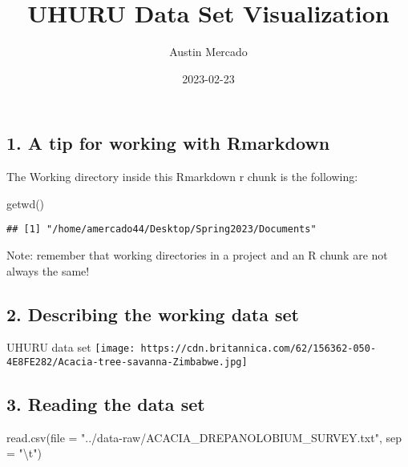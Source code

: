 \documentclass[
]{article}
\title{UHURU Data Set Visualization}
\author{Austin Mercado}
\date{2023-02-23}
\newenvironment{Shaded}{\begin{snugshade}}{\end{snugshade}}
\newcommand{\AttributeTok}[1]{\textcolor[rgb]{0.77,0.63,0.00}{#1}}
\newcommand{\FunctionTok}[1]{\textcolor[rgb]{0.00,0.00,0.00}{#1}}
\newcommand{\NormalTok}[1]{#1}
\newcommand{\SpecialCharTok}[1]{\textcolor[rgb]{0.00,0.00,0.00}{#1}}
\newcommand{\StringTok}[1]{\textcolor[rgb]{0.31,0.60,0.02}{#1}}
\begin{document}
\maketitle

\hypertarget{a-tip-for-working-with-rmarkdown}{%
\subsection{1. A tip for working with
Rmarkdown}\label{a-tip-for-working-with-rmarkdown}}

The Working directory inside this Rmarkdown r chunk is the following:

\begin{Shaded}
\begin{Highlighting}[]
\FunctionTok{getwd}\NormalTok{()}
\end{Highlighting}
\end{Shaded}

\begin{verbatim}
## [1] "/home/amercado44/Desktop/Spring2023/Documents"
\end{verbatim}

Note: remember that working directories in a project and an R chunk are
not always the same!

\hypertarget{describing-the-working-data-set}{%
\subsection{2. Describing the working data
set}\label{describing-the-working-data-set}}

UHURU data set
\texttt{[image: https://cdn.britannica.com/62/156362-050-4E8FE282/Acacia-tree-savanna-Zimbabwe.jpg]}

\hypertarget{reading-the-data-set}{%
\subsection{3. Reading the data set}\label{reading-the-data-set}}

\begin{Shaded}
\begin{Highlighting}[]
\FunctionTok{read.csv}\NormalTok{(}\AttributeTok{file =} \StringTok{"../data{-}raw/ACACIA\_DREPANOLOBIUM\_SURVEY.txt"}\NormalTok{, }\AttributeTok{sep =} \StringTok{"}\SpecialCharTok{\textbackslash{}t}\StringTok{"}\NormalTok{)}
\end{Highlighting}
\end{Shaded}
\end{document}
